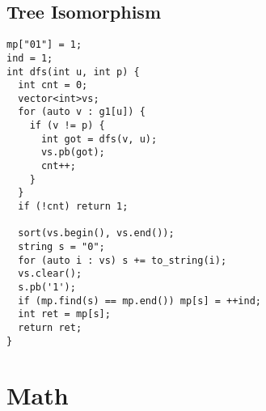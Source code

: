 \documentclass[10pt,a4paper,onesided]{article}
\begin{document}
\begin{multicols*}{3}
\subsection{Tree Isomorphism}
\begin{lstlisting}
mp["01"] = 1;
ind = 1;
int dfs(int u, int p) {
  int cnt = 0;
  vector<int>vs;
  for (auto v : g1[u]) {
    if (v != p) {
      int got = dfs(v, u);
      vs.pb(got);
      cnt++;
    }
  }
  if (!cnt) return 1;

  sort(vs.begin(), vs.end());
  string s = "0";
  for (auto i : vs) s += to_string(i);
  vs.clear();
  s.pb('1');
  if (mp.find(s) == mp.end()) mp[s] = ++ind;
  int ret = mp[s];
  return ret;
}
\end{lstlisting}
\section{Math}

\end{multicols*}
\end{document}
